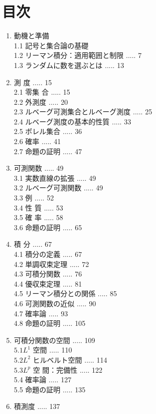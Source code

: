 \documentclass[14pt]{jsarticle}
\begin{document}
\section*{目次}
\begin{enumerate}
  \item 動機と準備\\
1.1 記号と集合論の基礎\\
1.2 リーマン積分：適用範囲と制限 ..... 7\\
1.3 ランダムに数を選ぶとは ..... 13
  \item 測 度 ..... 15\\
2.1 零集 合 ..... 15\\
2.2 外測度 ..... 20\\
2.3 ルベーグ可測集合とルベーグ測度 ..... 25\\
2.4 ルベーグ測度の基本的性質 ..... 33\\
2.5 ボレル集合 ..... 36\\
2.6 確率 ..... 41\\
2.7 命題の証明 ..... 47
  \item 可測関数 ..... 49\\
3.1 実数直線の拡張 ..... 49\\
3.2 ルベーグ可測関数 ..... 49\\
3.3 例 ..... 52\\
3.4 性 質 ..... 53\\
3.5 確 率 ..... 58\\
3.6 命題の証明 ..... 65
  \item 積 分 ..... 67\\
4.1 積分の定義 ..... 67\\
4.2 単調収束定理 ..... 72\\
4.3 可積分関数 ..... 76\\
4.4 優収束定理 ..... 81\\
4.5 リーマン積分との関係 ..... 85\\
4.6 可測関数の近似 ..... 90\\
4.7 確率論 ..... 93\\
4.8 命題の証明 ..... 105
  \item 可積分関数の空間 ..... 109\\
$5.1 L^{1}$ 空間 ..... 110\\
$5.2 L^{2}$ ヒルベルト空間 ..... 114\\
$5.3 L^{p}$ 空 間：完備性 ..... 122\\
5.4 確率論 ..... 127\\
5.5 命題の証明 ..... 135
  \item 積測度 ..... 137\\

\end{enumerate}
\end{document}
